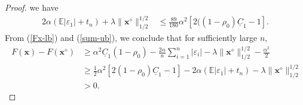 \documentclass{article}
\numberwithin{equation}{section}
\begin{document}
\begin{proof}
	we have
	\begin{equation}\label{sum-ub}
		\begin{aligned}
			2\alpha(\mathbb{E}|\varepsilon_1|+t_n)+\lambda\|\mathbf{x}^\diamond\|_{1/2}^{1/2}
			&\leq\frac{89}{180}\alpha^2[2((1-\rho_0)\underline{C}_1-1].
		\end{aligned}
	\end{equation}
	From (\ref{Fx-lb}) and (\ref{sum-ub}), we conclude that for sufficiently large $n$,
	\begin{equation}
		\begin{aligned}
			~F(\mathbf{x})-F(\mathbf{x}^\diamond)
			&\geq\alpha^2 \underline{C}_1(1-\rho_0)-\frac{2\alpha}{n}\sum_{i=1}^n|\varepsilon_i|-\lambda\|\mathbf{x}^\diamond\|_{1/2}^{1/2}-\frac{\alpha^2}{2}\\
			&\geq\frac{1}{2}\alpha^2[2(1-\rho_0)\underline{C}_1-1]-2\alpha(\mathbb{E}|\varepsilon_1|+t_n)-\lambda\|\mathbf{x}^\diamond\|_{1/2}^{1/2}\\
			&>0.		
		\end{aligned}
	\end{equation}

	
	

\end{proof}
\end{document}
